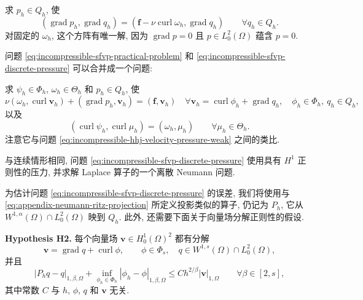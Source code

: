 求 $p_h\in Q_h$, 使
\begin{equation}\label{eq:incompressible-sfvp-discrete-pressure}
(\operatorname{grad}p_h,\operatorname{grad}q_h)
=(\mathbf f-\nu\operatorname{curl}\omega_h,
\operatorname{grad}q_h)
\qquad\forall q_h\in Q_h.
\end{equation}
对固定的 $\omega_h$, 这个方阵有唯一解,
因为 $\operatorname{grad}p=0$ 且 $p\in L_0^2(\Omega)$ 蕴含 $p=0$.

\begin{Remark}\label{rem:incompressible-sfvp-combined-problem}
问题 \eqref{eq:incompressible-sfvp-practical-problem}
和 \eqref{eq:incompressible-sfvp-discrete-pressure}
可以合并成一个问题:

求 $\psi_h\in\Phi_h$, $\omega_h\in\Theta_h$ 和 $p_h\in Q_h$, 使
\[
\nu(\omega_h,\operatorname{curl}\mathbf v_h)
+(\operatorname{grad}p_h,\mathbf v_h)
=(\mathbf f,\mathbf v_h)
\quad
\forall\mathbf v_h=\operatorname{curl}\phi_h+\operatorname{grad}q_h,
\quad \phi_h\in\Phi_h,\ q_h\in Q_h,
\]
以及
\[
(\operatorname{curl}\psi_h,\operatorname{curl}\mu_h)
=(\omega_h,\mu_h)
\qquad\forall\mu_h\in\Theta_h.
\]
注意它与问题 \eqref{eq:incompressible-hhj-velocity-pressure-weak}
之间的类比.
\end{Remark}

\begin{Remark}\label{rem:incompressible-sfvp-discrete-neumann}
与连续情形相同, 问题
\eqref{eq:incompressible-sfvp-discrete-pressure}
使用具有 $H^1$ 正则性的压力, 并求解 Laplace 算子的一个离散 Neumann 问题.
\end{Remark}

为估计问题 \eqref{eq:incompressible-sfvp-discrete-pressure}
的误差, 我们将使用与 \eqref{eq:appendix-neumann-ritz-projection}
所定义投影类似的算子, 仍记为 $P_h$,
它从 $W^{1,\alpha}(\Omega)\cap L_0^2(\Omega)$ 映到 $Q_h$.
此外, 还需要下面关于向量场分解正则性的假设.

\medskip
\noindent\textbf{Hypothesis H2.}
每个向量场 $\mathbf v\in H_0^1(\Omega)^2$ 都有分解
\[
\mathbf v=\operatorname{grad}q+\operatorname{curl}\phi,
\qquad
\phi\in\Phi_s,
\quad q\in W^{1,s}(\Omega)\cap L_0^2(\Omega),
\]
并且
\begin{equation}\label{eq:incompressible-sfvp-decomposition-approximation}
|P_hq-q|_{1,\beta,\Omega}
+\inf_{\phi_h\in\Phi_h}|\phi_h-\phi|_{1,\beta,\Omega}
\leq Ch^{2/\beta}|\mathbf v|_{1,\Omega}
\qquad\forall\beta\in[2,s],
\end{equation}
其中常数 $C$ 与 $h$, $\phi$, $q$ 和 $\mathbf v$ 无关.

